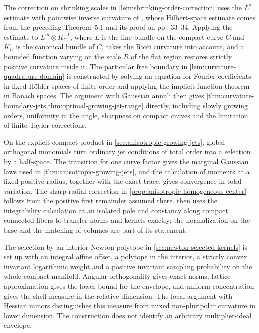 The correction on shrinking scales in \cref{lem:shrinking-order-correction} uses the $L^2$ estimate with pointwise inverse curvature of \cite[Theorem~5.2 and its singular-metric extension, pp.~34--35]{DemAM11}, whose Hilbert-space estimate comes from the preceding Theorem~5.1 and its proof on pp.~33--34. Applying the estimate to $L^m\otimes K_C^{-1}$, where $L$ is the line bundle on the compact curve $C$ and $K_C$ is the canonical bundle of $C$, takes the Ricci curvature into account, and a bounded function varying on the scale $R$ of the flat region restores strictly positive curvature inside it. The particular free boundary in \cref{lem:curvature-quadrature-domain} is constructed by solving an equation for Fourier coefficients in fixed H\"older spaces of finite order and applying the implicit function theorem in Banach spaces. The argument with Gaussian annuli then gives \cref{thm:curvature-boundary-jets,thm:optimal-growing-jet-range} directly, including slowly growing orders, uniformity in the angle, sharpness on compact curves and the limitation of finite Taylor corrections.

On the explicit compact product in \cref{sec:anisotropic-growing-jets}, global orthogonal monomials turn ordinary jet conditions of total order into a selection by a half-space. The transition for one curve factor gives the marginal Gaussian laws used in \cref{thm:anisotropic-growing-jets}, and the calculation of moments at a fixed positive radius, together with the exact trace, gives convergence in total variation. The sharp radial correction in \cref{prop:anisotropic-homogeneous-center} follows from the positive first remainder assumed there.  then uses the integrability calculation at an isolated pole and constancy along compact connected fibers to transfer norms and kernels exactly; the normalization on the base and the matching of volumes are part of its statement.

The selection by an interior Newton polytope in \cref{sec:newton-selected-kernels} is set up with an integral affine offset, a polytope in the interior, a strictly convex invariant logarithmic weight and a positive invariant sampling probability on the whole compact manifold. Angular orthogonality gives exact norms, lattice approximation gives the lower bound for the envelope, and uniform concentration gives the shell measure in the relative dimension. The local argument with Hessian minors distinguishes this measure from mixed non-pluripolar curvature in lower dimension. The construction does not identify an arbitrary multiplier-ideal envelope.

